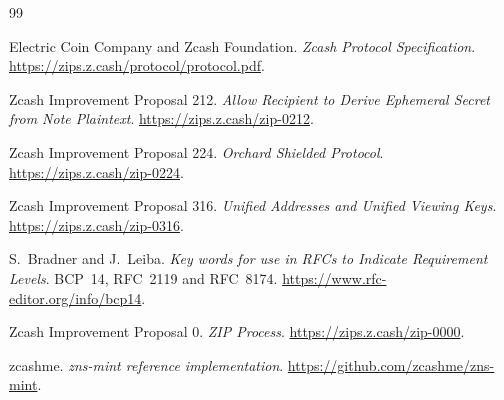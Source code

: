 \documentclass[11pt]{article}
\begin{document}





\begin{thebibliography}{99}

Electric Coin Company and Zcash Foundation.
\emph{Zcash Protocol Specification}.
\url{https://zips.z.cash/protocol/protocol.pdf}.

Zcash Improvement Proposal 212.
\emph{Allow Recipient to Derive Ephemeral Secret from Note Plaintext}.
\url{https://zips.z.cash/zip-0212}.

Zcash Improvement Proposal 224.
\emph{Orchard Shielded Protocol}.
\url{https://zips.z.cash/zip-0224}.

Zcash Improvement Proposal 316.
\emph{Unified Addresses and Unified Viewing Keys}.
\url{https://zips.z.cash/zip-0316}.

S.~Bradner and J.~Leiba.
\emph{Key words for use in RFCs to Indicate Requirement Levels}.
BCP~14, RFC~2119 and RFC~8174.
\url{https://www.rfc-editor.org/info/bcp14}.

Zcash Improvement Proposal 0.
\emph{ZIP Process}.
\url{https://zips.z.cash/zip-0000}.

zcashme.
\emph{zns-mint reference implementation}.
\url{https://github.com/zcashme/zns-mint}.

\end{thebibliography}
\end{document}
